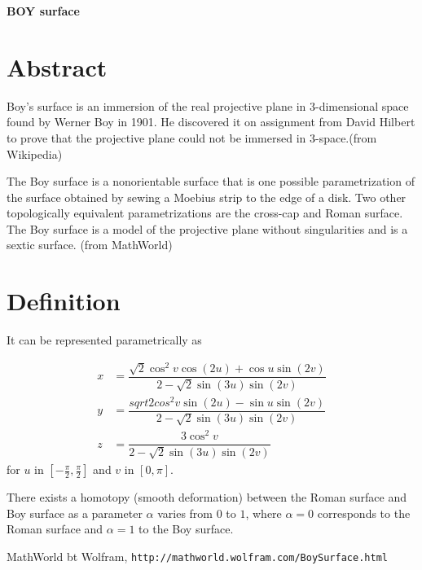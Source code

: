 \documentclass[12pt,dvipdfmx]{article}
\begin{document}
\begin{center}

{\bf \Large BOY surface}

\end{center}


\section{Abstract}

Boy's surface is an immersion of the real projective plane in 3-dimensional space found by Werner Boy in 1901. He discovered it on assignment from David Hilbert to prove that the projective plane could not be immersed in 3-space.(from Wikipedia)

The Boy surface is a nonorientable surface that is one possible parametrization of the surface obtained by sewing a Moebius strip to the edge of a disk. Two other topologically equivalent parametrizations are the cross-cap and Roman surface. The Boy surface is a model of the projective plane without singularities and is a sextic surface. (from MathWorld)

\section{Definition}

It can be represented parametrically as

\begin{align*}
x	&=	\dfrac{\sqrt{2} \cos^2v \cos(2u)+ \cos u \sin(2v)}{2-\sqrt{2} \sin(3u) \sin(2v)}	
\\
y	&=	\dfrac{sqrt{2}cos^2v \sin(2u)- \sin u \sin(2v)}{2-\sqrt{2} \sin(3u) \sin(2v)}	
\\
z	&=	\dfrac{3 \cos^2v}{2-\sqrt{2} \sin(3u) \sin(2v)}
\end{align*}
for $u$ in $\left[-\frac{\pi}{2},\frac{\pi}{2} \right]$ and $v$ in $[0, \pi]$.

There exists a homotopy (smooth deformation) between the Roman surface and Boy surface as a parameter $\alpha$ varies from $0$ to $1$, where $\alpha=0$ corresponds to the Roman surface and $\alpha=1$ to the Boy surface.
\begin{thebibliography}{9}

 MathWorld bt Wolfram, \verb|http://mathworld.wolfram.com/BoySurface.html|


\end{thebibliography}
\end{document}
